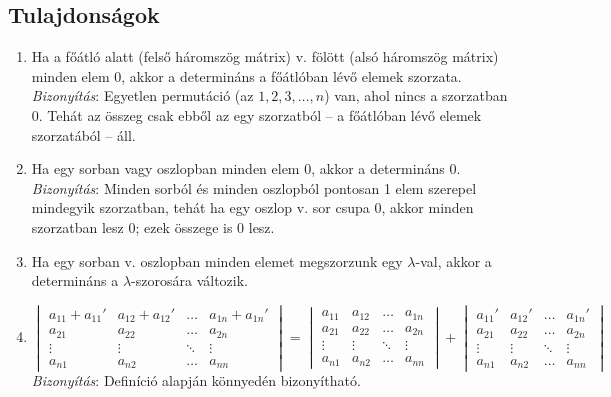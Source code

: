 \documentclass[a4paper,12pt,twoside]{book}
\theoremstyle{break}
\begin{document}
\subsection{Tulajdonságok}

\begin{enumerate}
\renewcommand{\theenumi}{\pscirclebox[boxsep=false]{\arabic{enumi}}}

 \item Ha a főátló alatt (felső háromszög mátrix) v. fölött (alsó háromszög mátrix) minden elem 0, akkor a determináns a főátlóban lévő elemek szorzata.\vspace*{5pt}\\
 \textit{Bizonyítás}: Egyetlen permutáció (az $1,2,3,\ldots,n$) van, ahol nincs a szorzatban 0. Tehát az összeg csak ebből az egy szorzatból -- a főátlóban lévő elemek szorzatából -- áll.

 \item Ha egy sorban vagy oszlopban minden elem 0, akkor a determináns 0.\vspace*{5pt}\\
 \textit{Bizonyítás}: Minden sorból és minden oszlopból pontosan 1 elem szerepel mindegyik szorzatban, tehát ha egy oszlop v. sor csupa 0, akkor minden szorzatban lesz 0; ezek összege is 0 lesz.

 \item Ha egy sorban v. oszlopban minden elemet megszorzunk egy $\lambda$-val, akkor a determináns a $\lambda$-szorosára változik.

 \item \[\begin{vmatrix}
a_{11}+a_{11}' & a_{12}+a_{12}' & \ldots & a_{1n}+a_{1n}'\\
a_{21} & a_{22} & \ldots & a_{2n}\\
\vdots & \vdots & \ddots & \vdots\\
a_{n1} & a_{n2} & \ldots & a_{nn}          
\end{vmatrix} = \begin{vmatrix}
a_{11} & a_{12} & \ldots & a_{1n}\\
a_{21} & a_{22} & \ldots & a_{2n}\\
\vdots & \vdots & \ddots & \vdots\\
a_{n1} & a_{n2} & \ldots & a_{nn}          
\end{vmatrix} + \begin{vmatrix}
a_{11}' & a_{12}' & \ldots & a_{1n}'\\
a_{21} & a_{22} & \ldots & a_{2n}\\
\vdots & \vdots & \ddots & \vdots\\
a_{n1} & a_{n2} & \ldots & a_{nn}          
\end{vmatrix}\]
\textit{Bizonyítás}: Definíció alapján könnyedén bizonyítható.


\end{enumerate}
\end{document}
